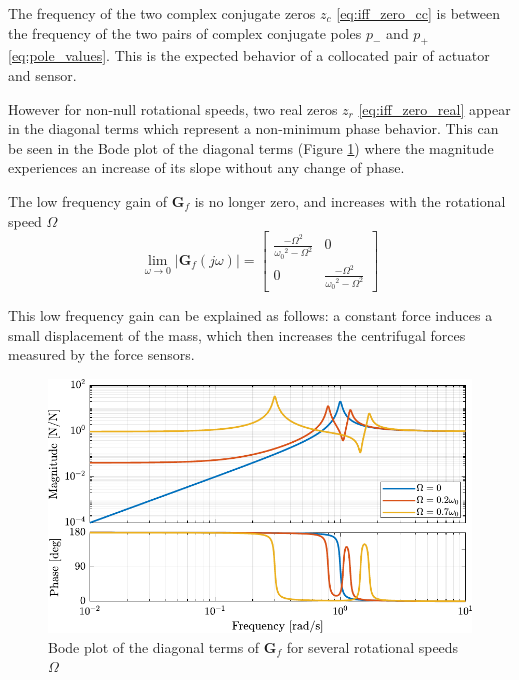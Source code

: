 \documentclass{ISMA_USD2020}
\begin{document}
The frequency of the two complex conjugate zeros \(z_c\) \eqref{eq:iff_zero_cc} is between the frequency of the two pairs of complex conjugate poles \(p_{-}\) and \(p_{+}\) \eqref{eq:pole_values}.
This is the expected behavior of a collocated pair of actuator and sensor.

However for non-null rotational speeds, two real zeros \(z_r\) \eqref{eq:iff_zero_real} appear in the diagonal terms which represent a non-minimum phase behavior.
This can be seen in the Bode plot of the diagonal terms (Figure \ref{fig:plant_iff_compare_rotating_speed}) where the magnitude experiences an increase of its slope without any change of phase.

The low frequency gain of \(\bm{G}_f\) is no longer zero, and increases with the rotational speed \(\Omega\)
\begin{equation}
\label{low_freq_gain_iff_plan}
  \lim_{\omega \to 0} \left| \bm{G}_f (j\omega) \right| = \begin{bmatrix}
  \frac{- \Omega^2}{{\omega_0}^2 - \Omega^2} & 0 \\
  0  & \frac{- \Omega^2}{{\omega_0}^2 - \Omega^2}
\end{bmatrix}
\end{equation}

This low frequency gain can be explained as follows: a constant force induces a small displacement of the mass, which then increases the centrifugal forces measured by the force sensors.
\begin{figure}[htbp]
\centering
\includegraphics[scale=1]{figs/plant_iff_compare_rotating_speed.pdf}
\caption{\label{fig:plant_iff_compare_rotating_speed}Bode plot of the diagonal terms of \(\bm{G}_f\) for several rotational speeds \(\Omega\)}
\end{figure}
\end{document}
